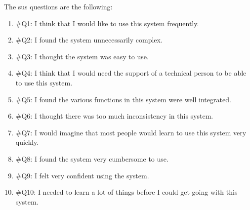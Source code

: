 The \ac{sus} questions are the following:
\begin{enumerate}
  \item \#Q1: I think that I would like to use this system frequently.
  \item \#Q2: I found the system unnecessarily complex.
  \item \#Q3: I thought the system was easy to use.
  \item \#Q4: I think that I would need the support of a technical person to be 
  able to use this system.
  \item \#Q5: I found the various functions in this system were well integrated.
  \item \#Q6: I thought there was too much inconsistency in this system.
  \item \#Q7: I would imagine that most people would learn to use this system 
  very quickly.
  \item \#Q8: I found the system very cumbersome to use.
  \item \#Q9: I felt very confident using the system.
  \item \#Q10: I needed to learn a lot of things before I could get going with 
  this system.
\end{enumerate}

